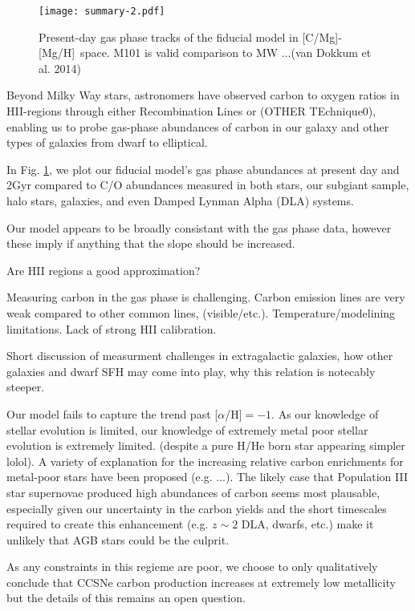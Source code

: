 \documentclass[12pt,oneside]{report}
\newcommand{\caah}{[C/Mg]-[Mg/H]}
\begin{document}
\begin{figure}
\centering
\texttt{[image: summary-2.pdf]}
\caption[Gas phase abundances]{Present-day gas phase tracks of the fiducial model in \caah~space. M101 is valid comparison to MW ...(van Dokkum et al. 2014)}
\label{fig:gas_phase}
\end{figure}

Beyond Milky Way stars, astronomers have observed carbon to oxygen ratios in
HII-regions through either Recombination Lines or (OTHER TEchnique0), enabling
us to probe gas-phase abundances of carbon in our galaxy and other types of
galaxies from dwarf to elliptical. 

In Fig. \ref{fig:gas_phase}, we plot our fiducial model's gas phase abundances
at present day and 2Gyr compared to C/O
abundances measured in both stars, our subgiant sample, halo stars, galaxies,
and even Damped Lynman Alpha (DLA) systems. 

Our model appears to be broadly consistant with the gas phase data, however these imply if anything that the slope should be increased. 

Are HII regions a good approximation?

Measuring carbon in the gas phase is challenging. Carbon emission lines are
very weak compared to other common lines, (visible/etc.).
Temperature/modelining limitations. Lack of strong HII calibration. 

Short discussion of measurment challenges in extragalactic galaxies, how other galaxies and dwarf SFH may come into play, why this relation is notecably steeper.

Our model fails to capture the trend past [$\alpha$/H]$=-1$. As our knowledge
of stellar evolution is limited, our knowledge of extremely metal poor stellar
evolution is extremely limited. (despite a pure H/He born star appearing
simpler lolol). A variety of explanation for the increasing relative carbon
enrichments for metal-poor stars have been proposed (e.g. ...). The likely case
that Population III star supernovae produced high abundances of carbon seems
most plausable, especially given our uncertainty in the carbon yields and the
short timescales required to create this enhancement (e.g. $z\sim 2$ DLA,
dwarfs, etc.) make it unlikely that AGB stars could be the culprit. 

As any constraints in this regieme are poor, we choose to only qualitatively
conclude that CCSNe carbon production increases at extremely low metallicity
but the details of this remains an open question.
\end{document}
